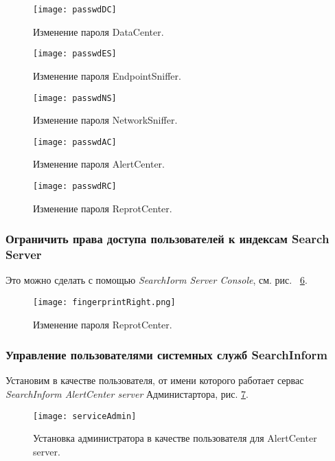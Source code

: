 \begin{figure}[H]
  \centering
  \texttt{[image: passwdDC]}
  \caption{Изменение пароля DataCenter.}\label{fig:passwdDC}
\end{figure}

\begin{figure}[H]
  \centering
  \texttt{[image: passwdES]}
  \caption{Изменение пароля EndpointSniffer.}\label{fig:passwdES}
\end{figure}

\begin{figure}[H]
  \centering
  \texttt{[image: passwdNS]}
  \caption{Изменение пароля NetworkSniffer.}\label{fig:passwdNS}
\end{figure}

\begin{figure}[H]
  \centering
  \texttt{[image: passwdAC]}
  \caption{Изменение пароля AlertCenter.}\label{fig:passwdAC}
\end{figure}

\begin{figure}[H]
  \centering
  \texttt{[image: passwdRC]}
  \caption{Изменение пароля ReprotCenter.}\label{fig:passwdRC}
\end{figure}

\subsubsection{Ограничить права доступа пользователей к индексам Search Server}

Это можно сделать с помощью \textit{SearchIorm Server Console}, см. рис.~
\ref{fig:fpRight}.

\begin{figure}[H]
  \centering
  \texttt{[image: fingerprintRight.png]}
  \caption{Изменение пароля ReprotCenter.}\label{fig:fpRight}
\end{figure}

\subsubsection{Управление пользователями системных служб SearchInform}

Установим в качестве пользователя, от имени которого работает сервас
\textit{SearchInform AlertCenter server} Администартора, рис.
\ref{fig:serviceAdmin}.

\begin{figure}[H]
  \centering
  \texttt{[image: serviceAdmin]}
  \caption{Установка администратора в качестве пользователя для
  AlertCenter server.}\label{fig:serviceAdmin}
\end{figure}


